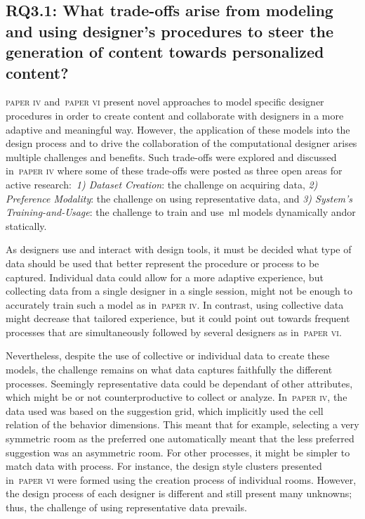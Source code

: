 \subsection[Research Question 3.1]{RQ3.1: What trade-offs arise from modeling and using designer's procedures to steer the generation of content towards personalized content?}

\textsc{paper iv} and~\textsc{paper vi} present novel approaches to model specific designer procedures in order to create content and collaborate with designers in a more adaptive and meaningful way. However, the application of these models into the design process and to drive the collaboration of the computational designer arises multiple challenges and benefits. Such trade-offs were explored and discussed in~\textsc{paper iv} where some of these trade-offs were posted as three open areas for active research:~\textit{1) Dataset Creation}: the challenge on acquiring data, \textit{2) Preference Modality}: the challenge on using representative data, and \textit{3) System's Training-and-Usage}: the challenge to train and use~\acrshort{ml} models dynamically and\/or statically.  


As designers use and interact with design tools, it must be decided what type of data should be used that better represent the procedure or process to be captured. Individual data could allow for a more adaptive experience, but collecting data from a single designer in a single session, might not be enough to accurately train such a model as in~\textsc{paper iv}. In contrast, using collective data might decrease that tailored experience, but it could point out towards frequent processes that are simultaneously followed by several designers as in~\textsc{paper vi}.

Nevertheless, despite the use of collective or individual data to create these models, the challenge remains on what data captures faithfully the different processes. Seemingly representative data could be dependant of other attributes, which might be or not counterproductive to collect or analyze. In~\textsc{paper iv}, the data used was based on the suggestion grid, which implicitly used the cell relation of the behavior dimensions. This meant that for example, selecting a very symmetric room as the preferred one automatically meant that the less preferred suggestion was an asymmetric room. For other processes, it might be simpler to match data with process. For instance, the design style clusters presented in~\textsc{paper vi} were formed using the creation process of individual rooms. However, the design process of each designer is different and still present many unknowns; thus, the challenge of using representative data prevails.

